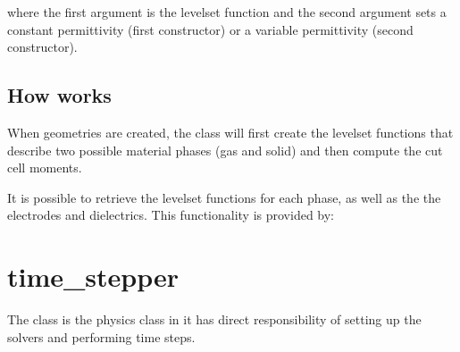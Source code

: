 \documentclass[letterpaper,10pt,english]{sphinxmanual}
\begin{document}
where the first argument is the level\sphinxhyphen{}set function and the second argument sets a constant permittivity (first constructor) or a variable permittivity (second constructor).


\subsection{How  works}
\label{\detokenize{ComputationalGeometry:how-computational-geometry-works}}
When geometries are created, the  class will first create the level\sphinxhyphen{}set functions that describe two possible material phases (gas and solid) and then compute the cut cell moments.

It is possible to retrieve the level\sphinxhyphen{}set functions for each phase, as well as the the electrodes and dielectrics.
This functionality is provided by:

\begin{sphinxVerbatim}[commandchars=\\\{\},formatcom=\scriptsize]
   
   

   
   
\end{sphinxVerbatim}


\section{time\_stepper}
\label{\detokenize{TimeStepper:time-stepper}}\label{\detokenize{TimeStepper:chap-time-stepper}}\label{\detokenize{TimeStepper::doc}}
The  class is the physics class in  \sphinxhyphen{} it has direct responsibility of setting up the solvers and performing time steps.
\end{document}
